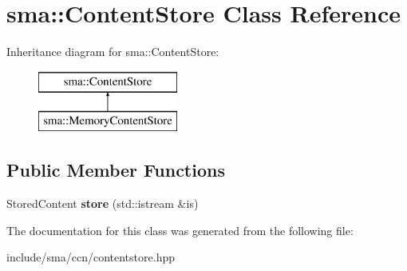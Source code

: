 \hypertarget{classsma_1_1ContentStore}{\section{sma\-:\-:Content\-Store Class Reference}
\label{classsma_1_1ContentStore}
}
Inheritance diagram for sma\-:\-:Content\-Store\-:\begin{figure}[H]
\begin{center}
\leavevmode
\includegraphics[height=2.000000cm]{classsma_1_1ContentStore}
\end{center}
\end{figure}
\subsection*{Public Member Functions}
\begin{DoxyCompactItemize}
\item 
\hypertarget{classsma_1_1ContentStore_a9f7e01764bfec2f75564a20fa7d1dc7f}{Stored\-Content {\bfseries store} (std\-::istream \&is)}\label{classsma_1_1ContentStore_a9f7e01764bfec2f75564a20fa7d1dc7f}

\end{DoxyCompactItemize}


The documentation for this class was generated from the following file\-:\begin{DoxyCompactItemize}
\item 
include/sma/ccn/contentstore.\-hpp\end{DoxyCompactItemize}
